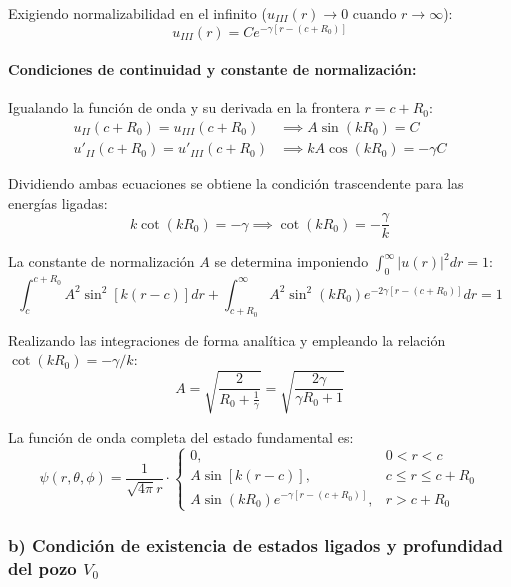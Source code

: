 \begin{problema}
Exigiendo normalizabilidad en el infinito ($u_{III}(r) \to 0$ cuando $r \to \infty$):
\begin{equation}
u_{III}(r) = C e^{-\gamma \left[ r - (c + R_0) \right]}
\end{equation}

\paragraph{Condiciones de continuidad y constante de normalización:}
Igualando la función de onda y su derivada en la frontera $r = c + R_0$:
\begin{align}
u_{II}(c + R_0) = u_{III}(c + R_0) &\implies A \sin(k R_0) = C \\
u'_{II}(c + R_0) = u'_{III}(c + R_0) &\implies k A \cos(k R_0) = -\gamma C
\end{align}

Dividiendo ambas ecuaciones se obtiene la condición trascendente para las energías ligadas:
\begin{equation}
k \cot(k R_0) = -\gamma \implies \cot(k R_0) = -\frac{\gamma}{k}
\end{equation}

La constante de normalización $A$ se determina imponiendo $\int_0^\infty |u(r)|^2 dr = 1$:
\begin{equation}
\int_c^{c+R_0} A^2 \sin^2 \left[ k (r - c) \right] dr + \int_{c+R_0}^\infty A^2 \sin^2(k R_0) e^{-2\gamma \left[ r - (c + R_0) \right]} dr = 1
\end{equation}

Realizando las integraciones de forma analítica y empleando la relación $\cot(k R_0) = -\gamma / k$:
\begin{equation}
A = \sqrt{\frac{2}{R_0 + \frac{1}{\gamma}}} = \sqrt{\frac{2 \gamma}{\gamma R_0 + 1}}
\end{equation}

La función de onda completa del estado fundamental es:
\begin{equation}
\psi(r,\theta,\phi) = \frac{1}{\sqrt{4\pi} r} \cdot 
\begin{cases} 
0, & 0 < r < c \\ 
A \sin\left[k(r-c)\right], & c \le r \le c + R_0 \\ 
A \sin(k R_0) e^{-\gamma \left[r - (c + R_0)\right]}, & r > c + R_0 
\end{cases}
\end{equation}

\subsubsection*{b) Condición de existencia de estados ligados y profundidad del pozo $V_0$}


\end{problema}
